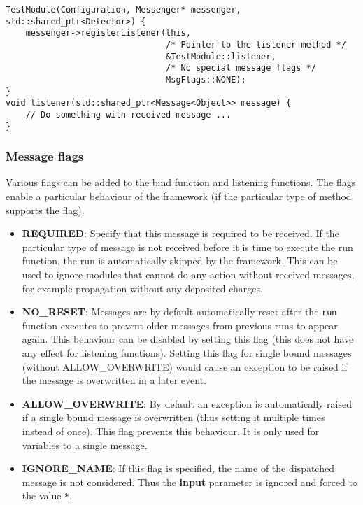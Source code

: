 \begin{enumerate}
\begin{verbatim}
TestModule(Configuration, Messenger* messenger, std::shared_ptr<Detector>) {
    messenger->registerListener(this,
                                /* Pointer to the listener method */
                                &TestModule::listener,
                                /* No special message flags */
                                MsgFlags::NONE);
}
void listener(std::shared_ptr<Message<Object>> message) {
    // Do something with received message ...
}
\end{verbatim}
\end{enumerate}

\subsubsection{Message flags}
Various flags can be added to the bind function and listening functions. The flags enable a particular behaviour of the framework (if the particular type of method supports the flag).
\begin{itemize}
\item \textbf{REQUIRED}: Specify that this message is required to be received. If the particular type of message is not received before it is time to execute the run function, the run is automatically skipped by the framework. This can be used to ignore modules that cannot do any action without received messages, for example propagation without any deposited charges.
\item \textbf{NO\_RESET}: Messages are by default automatically reset after the \texttt{run} function executes to prevent older messages from previous runs to appear again. This behaviour can be disabled by setting this flag (this does not have any effect for listening functions). Setting this flag for single bound messages (without ALLOW\_OVERWRITE) would cause an exception to be raised if the message is overwritten in a later event.
\item \textbf{ALLOW\_OVERWRITE}: By default an exception is automatically raised if a single bound message is overwritten (thus setting it multiple times instead of once). This flag prevents this behaviour. It is only used for variables to a single message.
\item \textbf{IGNORE\_NAME}: If this flag is specified, the name of the dispatched message is not considered. Thus the \textbf{input} parameter is ignored and forced to the value \texttt{*}. 
\end{itemize}

